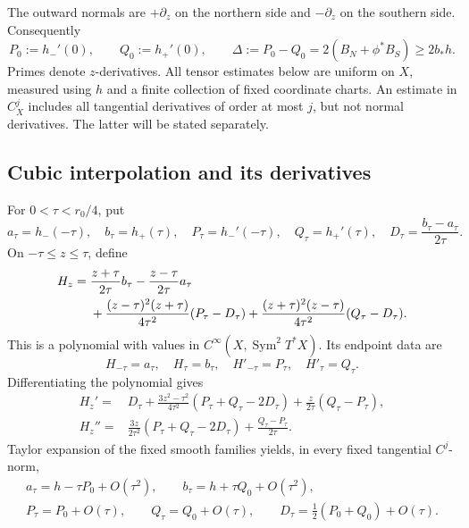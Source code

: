 \documentclass[12pt]{amsart}
\numberwithin{equation}{section}
\theoremstyle{remark}
\begin{document}
The outward normals are \(+\partial_z\) on the northern side
and \(-\partial_z\) on the southern side. Consequently
\begin{equation}\label{eq:glue-jump}
 P_0:=h_-'(0),\qquad Q_0:=h_+'(0),\qquad
 \Delta:=P_0-Q_0=2(B_N+\phi^*B_S)\ge2b_*h.
\end{equation}
Primes denote \(z\)-derivatives. All tensor estimates below are
uniform on \(X\), measured using \(h\) and a finite collection of
fixed coordinate charts. An estimate in \(C_X^j\) includes
all tangential derivatives of order at most \(j\), but not
normal derivatives. The latter will be stated separately.

\subsection{Cubic interpolation and its derivatives}
For \(0<\tau<r_0/4\), put
\[
 a_\tau=h_-(-\tau),\quad b_\tau=h_+(\tau),\quad
 P_\tau=h_-'(-\tau),\quad Q_\tau=h_+'(\tau),\quad
 D_\tau=\frac{b_\tau-a_\tau}{2\tau}.
\]
On \(-\tau\le z\le\tau\), define
\begin{align}
 H_z={}&\frac{z+\tau}{2\tau}b_\tau
        -\frac{z-\tau}{2\tau}a_\tau\notag\\
 &+\frac{(z-\tau)^2(z+\tau)}{4\tau^2}(P_\tau-D_\tau)
  +\frac{(z+\tau)^2(z-\tau)}{4\tau^2}(Q_\tau-D_\tau).
 \label{eq:glue-hermite}
\end{align}
This is a polynomial with values in
\(C^\infty(X,\operatorname{Sym}^2T^*X)\). Its endpoint data are
\begin{equation}\label{eq:glue-endpoint-jets}
 H_{-\tau}=a_\tau,\quad H_\tau=b_\tau,\quad
 H'_{-\tau}=P_\tau,\quad H'_\tau=Q_\tau.
\end{equation}
Differentiating the polynomial gives
\begin{align}
 H_z'={}&D_\tau+
 \frac{3z^2-\tau^2}{4\tau^2}(P_\tau+Q_\tau-2D_\tau)
 +\frac{z}{2\tau}(Q_\tau-P_\tau),
 \label{eq:glue-hermite-first}\\
 H_z''={}&\frac{3z}{2\tau^2}(P_\tau+Q_\tau-2D_\tau)
 +\frac{Q_\tau-P_\tau}{2\tau}.
 \label{eq:glue-hermite-second}
\end{align}
Taylor expansion of the fixed smooth families yields, in every
fixed tangential \(C^j\)-norm,
\begin{gather*}
 a_\tau=h-\tau P_0+O(\tau^2),\qquad
 b_\tau=h+\tau Q_0+O(\tau^2),\\
 P_\tau=P_0+O(\tau),\qquad Q_\tau=Q_0+O(\tau),\qquad
 D_\tau=\tfrac12(P_0+Q_0)+O(\tau).
\end{gather*}
\end{document}
